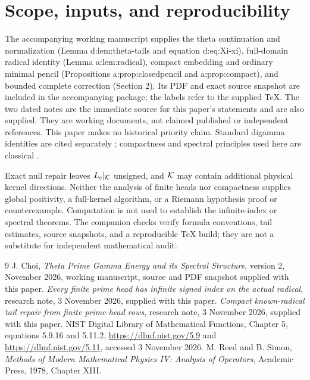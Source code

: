 \documentclass[11pt]{article}
\begin{document}
\section{Scope, inputs, and reproducibility}\label{source-note}
The accompanying working manuscript \cite{source} supplies the theta continuation and normalization (Lemma d:lem:theta-tails and equation d:eq:Xi-xi), full-domain radical identity (Lemma a:lem:radical), compact embedding and ordinary minimal pencil (Propositions a:prop:closedpencil and a:prop:compact), and bounded complete correction (Section 2). Its PDF and exact source snapshot are included in the accompanying package; the labels refer to the supplied TeX. The two dated notes \cite{note1,note2} are the immediate source for this paper's statements and are also supplied. They are working documents, not claimed published or independent references. This paper makes no historical priority claim. Standard digamma identities are cited separately \cite{dlmf}; compactness and spectral principles used here are classical \cite{reed}.

Exact null repair leaves $L_c|_{\mathcal K}$ unsigned, and $\mathcal K$ may contain additional physical kernel directions. Neither the analysis of finite heads nor compactness supplies global positivity, a full-kernel algorithm, or a Riemann hypothesis proof or counterexample. Computation is not used to establish the infinite-index or spectral theorems. The companion checks verify formula conventions, tail estimates, source snapshots, and a reproducible TeX build; they are not a substitute for independent mathematical audit.

\begin{thebibliography}{9}
 J. Choi, \emph{Theta Prime Gamma Energy and its Spectral Structure}, version 2, November 2026, working manuscript, source and PDF snapshot supplied with this paper.
 \emph{Every finite prime head has infinite signed index on the actual radical}, research note, 3 November 2026, supplied with this paper.
 \emph{Compact known-radical tail repair from finite prime-head rows}, research note, 3 November 2026, supplied with this paper.
 NIST Digital Library of Mathematical Functions, Chapter 5, equations 5.9.16 and 5.11.2, \url{https://dlmf.nist.gov/5.9} and \url{https://dlmf.nist.gov/5.11}, accessed 3 November 2026.
 M. Reed and B. Simon, \emph{Methods of Modern Mathematical Physics IV: Analysis of Operators}, Academic Press, 1978, Chapter XIII.
\end{thebibliography}
\end{document}
